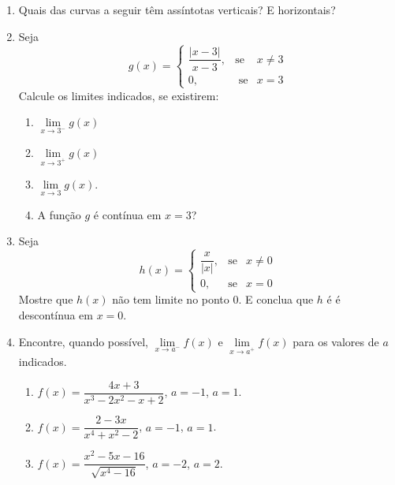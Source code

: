 \begin{enumerate}
\item Quais das curvas a seguir têm assíntotas verticais? E horizontais?
\begin{enumerate}
    \end{enumerate}

\item Seja $$g(x) = \left\{\begin{array}{rcl}\dfrac{|x
- 3|}{ x - 3},& \mbox{se}& x \ne 3 \\
0,& \mbox{ se}& x = 3  \end{array} \right.$$ Calcule os limites
indicados, se existirem:
    \begin{enumerate}
    \item $ \lim\limits_{x\to 3^-} g(x) $
    \item $\lim\limits_{x\to 3^+} g(x)$ 
    \item $\lim\limits_{x\to 3} g(x).$
    \item A função $g$ é contínua em $x=3$?
    \end{enumerate}
\item Seja $$h(x) =
\left\{\begin{array}{rcl}
\dfrac{x}{|x|},& \mbox{se}& x \ne 0\\
 0,& \mbox{se}& x = 0
 \end{array} \right.$$
Mostre que $h(x)$ não tem limite no ponto 0. E conclua que $h$ é é descontínua em $x=0$.

\item Encontre, quando possível, $\lim\limits_{x\to a^-}f(x)$ e $\lim\limits_{x\to a^+}f(x)$ para os valores de $a$ indicados.
    \begin{enumerate}
    \item $f(x) =\dfrac{4x+3}{x^3-2x^2-x+2}$, \quad  $a=-1$, $a=1$.
    \item $f(x)=\dfrac{2-3x}{x^4+x^2-2}$, \quad $a=-1$, $a=1$.
    \item $f(x)=\dfrac{x^2-5x-16}{\sqrt{x^4-16}}$, \quad $a=-2$, $a=2$.
    \end{enumerate}


\end{enumerate}

